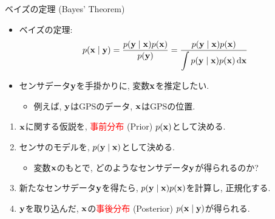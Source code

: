 \documentclass[dvipdfmx,notheorems,t]{beamer}
\begin{document}
\begin{frame}{ベイズの定理 (Bayes' Theorem)}
\begin{itemize}
  \item ベイズの定理:
  \begin{align*}
    p(\vb{x} \mid \vb{y}) = \frac{p(\vb{y} \mid \vb{x}) p(\vb{x})}{p(\vb{y})}
      = \frac{p(\vb{y} \mid \vb{x}) p(\vb{x})}{
        \displaystyle \int p(\vb{y} \mid \vb{x}) p(\vb{x}) \dd{\vb{x}}}
  \end{align*}
  \item センサデータ$\vb{y}$を手掛かりに, 変数$\vb{x}$を推定したい.
  \begin{itemize}
    \item 例えば, $\vb{y}$はGPSのデータ, $\vb{x}$はGPSの位置.
  \end{itemize}
\end{itemize}

\begin{enumerate}
  \item $\vb{x}$に関する仮説を, \textcolor{red}{事前分布} (Prior) $p(\vb{x})$として決める.
  \item センサのモデルを, $p(\vb{y} \mid \vb{x})$として決める.
  \begin{itemize}
    \item 変数$\vb{x}$のもとで, どのようなセンサデータ$\vb{y}$が得られるのか?
  \end{itemize}
  \item 新たなセンサデータ$\vb{y}$を得たら, $p(\vb{y} \mid \vb{x}) p(\vb{x})$を計算し, 正規化する.
  \item $\vb{y}$を取り込んだ, $\vb{x}$の\textcolor{red}{事後分布} (Posterior) $p(\vb{x} \mid \vb{y})$が得られる.
\end{enumerate}
\end{frame}
\end{document}
